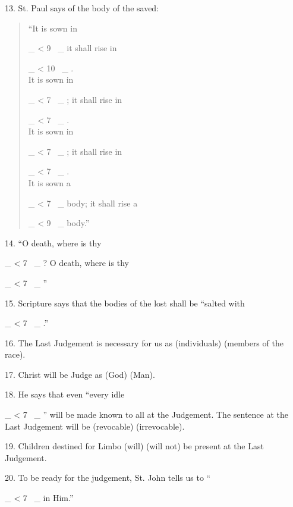 \documentclass[a4paper,14pt]{memoir}
\newcommand\textjarman[1]{{\jarman #1}}
\newcounter{z}
\newcommand\spaces[1]{\rule{0pt}{18pt} \_\loop \ifnum\value{z} < #1
~\_%
\stepcounter{z}%
\repeat%
\setcounter{z}{0}}
\begin{document}
13. St. Paul says of  the
body of the saved: 

\begin{quote}
“It is sown in \spaces{9} it shall  rise  in  \spaces{10}. \\ It  is
sown in \spaces{7}; it shall rise in \spaces{7}.\\ It is  sown  in  \spaces{7};  it  shall
rise in \spaces{7}.\\ It is sown a \spaces{7} body; it shall rise a \spaces{9} body.”  
\end{quote}

14.
“O death, where is thy \spaces{7}? O death, where is thy \spaces{7}”  

15.  Scripture
says that the bodies of the lost shall be  “salted  with  \spaces{7}.”  

16.  The
Last Judgement is necessary for us as (\textjarman{individuals}) (\textjarman{members of  the  race}).


17. Christ will be Judge as (\textjarman{God}) (\textjarman{Man}). 

18. He says that even  “every  idle
\spaces{7}” will be made known to all at the  Judgement.  The  sentence  at  the
Last Judgement will be (\textjarman{revocable}) (\textjarman{irrevocable}). 

19. Children destined  for
Limbo (\textjarman{will}) (\textjarman{will not}) be present at the Last Judgement. 

20.  To  be  ready
for the judgement, St. John tells us to “\spaces{7} in Him.”


\newpage
\end{document}
